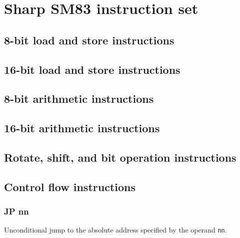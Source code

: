 
\chapter{Sharp SM83 instruction set}

\section{8-bit load and store instructions}

\section{16-bit load and store instructions}

\section{8-bit arithmetic instructions}

\section{16-bit arithmetic instructions}

\section{Rotate, shift, and bit operation instructions}

\section{Control flow instructions}

\subsection{JP nn}
\label{inst:JP}

Unconditional jump to the absolute address specified by the operand \texttt{nn}.

